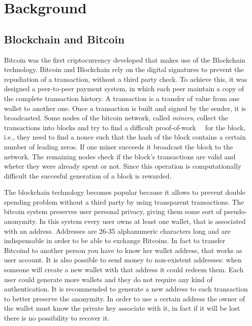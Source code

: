 \section{Background}
\subsection{Blockchain and Bitcoin}
Bitcoin was the first criptocurrency developed that makes use of the Blockchain
technology. Bitcoin and Blockchain rely on the digital signatures
to prevent the repudiation of a transaction, without a third party check.
To achieve this, it was designed a peer-to-peer payment system, in which each
peer maintain a copy of the complete transaction history.
A transaction is a transfer of value from one wallet to another one.
Once a transaction is built and signed by the sender, it is broadcasted.
Some nodes of the bitcoin network, called \textit{miners}, collect the
transactions into blocks and try to find a difficult
proof-of-work~\cite{pricing}~\cite{hashcash} for the
block, i.e., they need to find a nonce such that the hash of the block contains
a certain number of leading zeros. 
If one miner succeeds it broadcast the block to the network.
The remaining nodes check if the block's transactions are valid and wheter
they were already spent or not.
Since this operation is computationally difficult the succesful generation
of a block is rewarded.

The blockchain technology becomes popular because it allows
to prevent double spending problem without a third party by using
transparent transactions.
The bitcoin system preserves user personal privacy, giving them some sort of
pseudo-anonymity.
In this system every user owns at least one wallet, that is associated with an
address. Addresses are 26-35 alphanumeric characters long and are indispensable
in order to be able to exchange Bitcoins. In fact to transfer Bitcoind to
another person you have to know her wallet address, that works as user account.
It is also possible to send money to non-existent addresses: when someone will
create a new wallet with that address it could redeem them.
Each user could generate more wallets and they do not require any kind of
authentication. It is recommended to generate a new address to each transaction
to better preserve the anonymity\cite{satoshi}.
In order to use a certain address the
owner of the wallet must know the private key associate with it, in fact if it
will be lost there is no possibility to recover it. 



